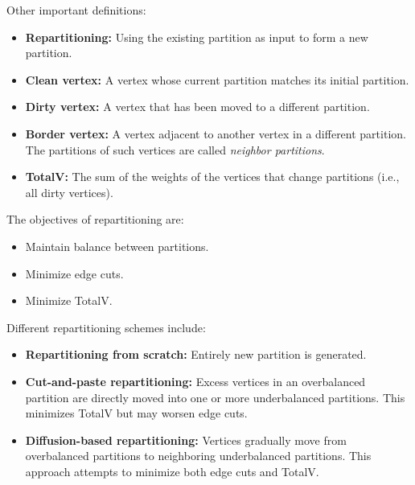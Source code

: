\documentclass[12pt]{book}
\begin{document}
Other important definitions:
\begin{itemize}
    \item \textbf{Repartitioning:} Using the existing partition as input to form a new partition. 
    \item \textbf{Clean vertex:} A vertex whose current partition matches its initial partition.
    \item \textbf{Dirty vertex:} A vertex that has been moved to a different partition.
    \item \textbf{Border vertex:} A vertex adjacent to another vertex in a different partition. The partitions of such vertices are called \emph{neighbor partitions}.
    \item \textbf{TotalV:} The sum of the weights of the vertices that change partitions (i.e., all dirty vertices).
\end{itemize}

The objectives of repartitioning are:
\begin{itemize}
    \item Maintain balance between partitions.
    \item Minimize edge cuts.
    \item Minimize TotalV.
\end{itemize}

Different repartitioning schemes include:
\begin{itemize}
    \item \textbf{Repartitioning from scratch:} Entirely new partition is generated.
    \item \textbf{Cut-and-paste repartitioning:} Excess vertices in an overbalanced partition are directly moved into one or more underbalanced partitions. This minimizes TotalV but may worsen edge cuts.
    \item \textbf{Diffusion-based repartitioning:} Vertices gradually move from overbalanced partitions to neighboring underbalanced partitions. This approach attempts to minimize both edge cuts and TotalV.
\end{itemize}
\end{document}
